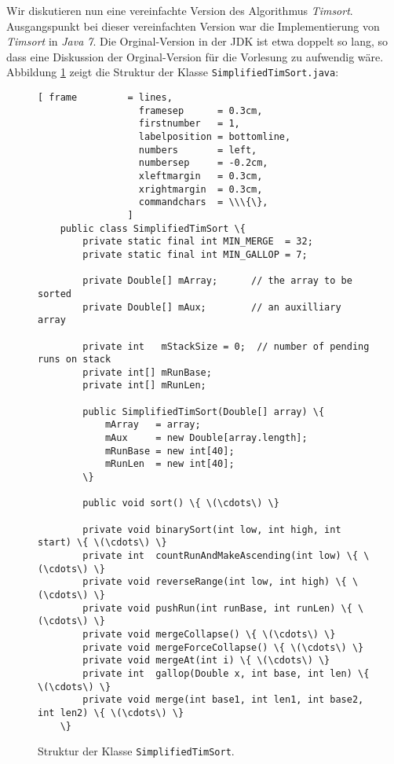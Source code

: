 Wir diskutieren nun eine vereinfachte Version des Algorithmus \emph{Timsort}.  Ausgangspunkt bei
dieser vereinfachten Version war die Implementierung von \emph{Timsort} in \textsl{Java 7}.
Die Orginal-Version in der JDK ist etwa doppelt so lang, so dass eine Diskussion der Orginal-Version
f\"ur die Vorlesung zu aufwendig w\"are.  Abbildung \ref{fig:TimSort.java} zeigt die Struktur der Klasse
\texttt{SimplifiedTimSort.java}:

\begin{figure}[!ht]
\centering
\begin{Verbatim}[ frame         = lines, 
                  framesep      = 0.3cm, 
                  firstnumber   = 1,
                  labelposition = bottomline,
                  numbers       = left,
                  numbersep     = -0.2cm,
                  xleftmargin   = 0.3cm,
                  xrightmargin  = 0.3cm,
                  commandchars  = \\\{\},
                ]
    public class SimplifiedTimSort \{
        private static final int MIN_MERGE  = 32;  
        private static final int MIN_GALLOP = 7;
    
        private Double[] mArray;      // the array to be sorted
        private Double[] mAux;        // an auxilliary array 
    
        private int   mStackSize = 0;  // number of pending runs on stack
        private int[] mRunBase;
        private int[] mRunLen;
    
        public SimplifiedTimSort(Double[] array) \{
            mArray   = array;
            mAux     = new Double[array.length];  
            mRunBase = new int[40];
            mRunLen  = new int[40];
        \}
    
        public void sort() \{ \(\cdots\) \}
    
        private void binarySort(int low, int high, int start) \{ \(\cdots\) \}
        private int  countRunAndMakeAscending(int low) \{ \(\cdots\) \}
        private void reverseRange(int low, int high) \{ \(\cdots\) \}
        private void pushRun(int runBase, int runLen) \{ \(\cdots\) \}
        private void mergeCollapse() \{ \(\cdots\) \}
        private void mergeForceCollapse() \{ \(\cdots\) \}
        private void mergeAt(int i) \{ \(\cdots\) \}
        private int  gallop(Double x, int base, int len) \{ \(\cdots\) \}
        private void merge(int base1, int len1, int base2, int len2) \{ \(\cdots\) \}
    \}
\end{Verbatim}
\vspace*{-0.3cm}
\caption{Struktur der Klasse \texttt{SimplifiedTimSort}.}
\label{fig:TimSort.java}
\end{figure}

